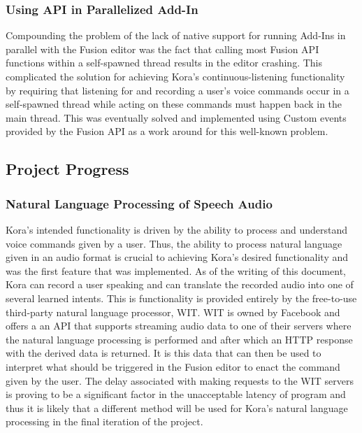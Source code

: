 \documentclass[onecolumn, draftclsnofoot,10pt, compsoc]{IEEEtran}
\begin{document}
    	\subsubsection{Using API in Parallelized Add-In}
		    Compounding the problem of the lack of native support for running Add-Ins in parallel with the Fusion editor was the fact that calling most Fusion API functions within a self-spawned thread results in the editor crashing.
		    This complicated the solution for achieving Kora’s continuous-listening functionality by requiring that listening for and recording a user’s voice commands occur in a self-spawned thread while acting on these commands must happen back in the main thread.
		    This was eventually solved and implemented using Custom events provided by the Fusion API as a work around for this well-known problem.


	\subsection{Project Progress}
    	\subsubsection{Natural Language Processing of Speech Audio}
		    Kora’s intended functionality is driven by the ability to process and understand voice commands given by a user.
		    Thus, the ability to process natural language given in an audio format is crucial to achieving Kora’s desired functionality and was the first feature that was implemented.
		    As of the writing of this document, Kora can record a user speaking and can translate the recorded audio into one of several learned intents.
		    This is functionality is provided entirely by the free-to-use third-party natural language processor, WIT.
		    WIT is owned by Facebook and offers a an API that supports streaming audio data to one of their servers where the natural language processing is performed and after which an HTTP response with the derived data is returned.
		    It is this data that can then be used to interpret what should be triggered in the Fusion editor to enact the command given by the user.
		    The delay associated with making requests to the WIT servers is proving to be a significant factor in the unacceptable latency of program and thus it is likely that a different method will be used for Kora’s natural language processing in the final iteration of the project.
 
\end{document}

